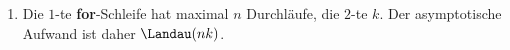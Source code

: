 \begin{solution}
\begin{enumerate}[label = \alph*]
\begin{enumerate}[label = \arabic*.]
  \end{enumerate}

  \item Die $1$-te \textbf{for}-Schleife hat maximal $n$ Durchläufe, die $2$-te $k$.
  Der asymptotische Aufwand ist daher $\Landau(nk)$.

\end{enumerate}

\end{solution}
